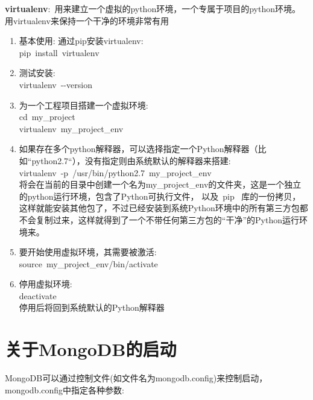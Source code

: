 \documentclass[10pt,a4paper]{article}
\begin{document}
\textbf{virtualenv}:~用来建立一个虚拟的\textrm{python}环境，一个专属于项目的\textrm{python}环境。
用\textrm{virtualenv}来保持一个干净的环境非常有用
\begin{enumerate}
	\item 基本使用: 通过\textrm{pip}安装\textrm{virtualenv}:\\
		\textrm{pip~install~virtualenv}
	\item 测试安装:\\
		\textrm{virtualenv~-\/-version}
	\item 为一个工程项目搭建一个虚拟环境:\\
		\textrm{cd~my\_project}\\
		\textrm{virtualenv~my\_project_env}
	\item 如果存在多个\textrm{python}解释器，可以选择指定一个\textrm{Python}解释器（比如``\textrm{python2.7}``），没有指定则由系统默认的解释器来搭建:\\
		\textrm{virtualenv~-p~/usr/bin/python2.7~my\_project\_env}\\
		将会在当前的目录中创建一个名为\textrm{my\_project\_env}的文件夹，这是一个独立的\textrm{python}运行环境，包含了\textrm{Python}可执行文件， 以及~\textrm{pip}~ 库的一份拷贝，这样就能安装其他包了，不过已经安装到系统\textrm{Python}环境中的所有第三方包都不会复制过来，这样就得到了一个不带任何第三方包的“干净”的\textrm{Python}运行环境来。
	\item 要开始使用虚拟环境，其需要被激活:\\
		\textrm{source~my\_project\_env/bin/activate}
	\item 停用虚拟环境:\\
		\textrm{deactivate}\\
		停用后将回到系统默认的\textrm{Python}解释器
\end{enumerate}

\section{关于\textrm{MongoDB}的启动}
\textrm{MongoDB}可以通过控制文件(如文件名为\textrm{mongodb.config})来控制启动，\textrm{mongodb.config}中指定各种参数:\\
\end{document}
